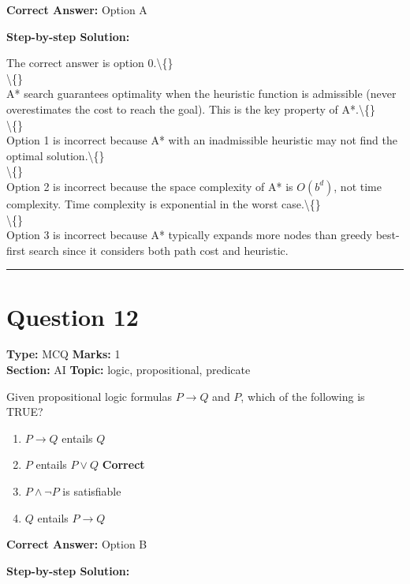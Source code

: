 \documentclass[11pt]{article}
\begin{document}
\textbf{Correct Answer:} Option A

\textbf{Step-by-step Solution:}

The correct answer is option 0.\textbackslash\{\}\\
\textbackslash\{\}\\
A* search guarantees optimality when the heuristic function is admissible (never overestimates the cost to reach the goal). This is the key property of A*.\textbackslash\{\}\\
\textbackslash\{\}\\
Option 1 is incorrect because A* with an inadmissible heuristic may not find the optimal solution.\textbackslash\{\}\\
\textbackslash\{\}\\
Option 2 is incorrect because the space complexity of A* is \(O(b^d)\), not time complexity. Time complexity is exponential in the worst case.\textbackslash\{\}\\
\textbackslash\{\}\\
Option 3 is incorrect because A* typically expands more nodes than greedy best-first search since it considers both path cost and heuristic.

\vspace{0.8em}
\hrule
\vspace{0.4em}
\section*{Question 12}
\textbf{Type:} MCQ \hfill \textbf{Marks:} 1\\
\textbf{Section:} AI \hfill \textbf{Topic:} logic, propositional, predicate

Given propositional logic formulas \(P \rightarrow Q\) and \(P\), which of the following is TRUE?


\begin{enumerate}[label=\textbf{\Alph*.}, leftmargin=1.8em]
\item \(P \rightarrow Q\) entails \(Q\)\item \(P\) entails \(P \vee Q\) \hfill {\color{gategreen}\textbf{Correct}}\item \(P \wedge \neg P\) is satisfiable\item \(Q\) entails \(P \rightarrow Q\)\end{enumerate}

\textbf{Correct Answer:} Option B

\textbf{Step-by-step Solution:}
\end{document}
